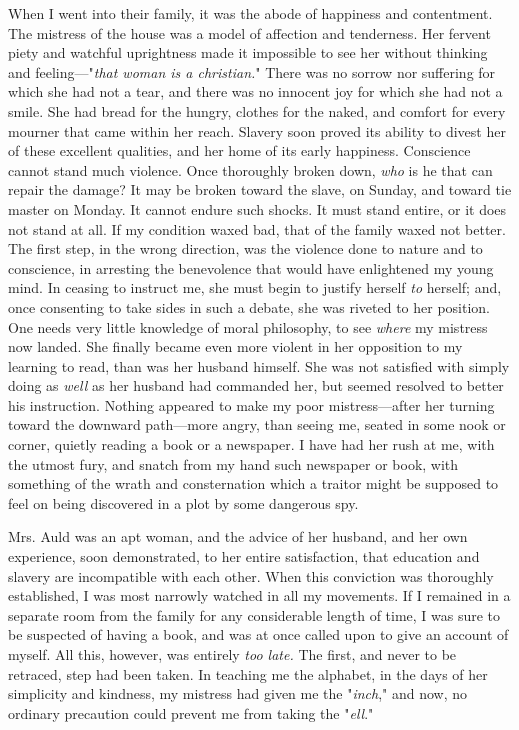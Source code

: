 When I went into their family, it was the abode of happiness and
contentment. The mistress of the house was a model of affection and
tenderness. Her fervent piety and watchful uprightness made it
impossible to see her without thinking and feeling---"\emph{that woman
is a christian.}" There was no sorrow nor suffering for which she had
not a tear, and there was no innocent joy for which she had not a smile.
She had bread for the hungry, clothes for the naked, and comfort for
every mourner that came within her reach. Slavery soon proved its
ability to divest her of these excellent qualities, and her home of its
early happiness. Conscience cannot stand much violence. Once thoroughly
broken down, \emph{who} is he that can repair the damage? It may be
broken toward the slave, on Sunday, and toward tie master on Monday. It
cannot endure such shocks. It must stand entire, or it does not stand at
all. If my condition waxed bad, that of the family waxed not better. The
first step, in the wrong direction, was the violence done to {}nature
and to conscience, in arresting the benevolence that would have
enlightened my young mind. In ceasing to instruct me, she must begin to
justify herself \emph{to} herself; and, once consenting to take sides in
such a debate, she was riveted to her position. One needs very little
knowledge of moral philosophy, to see \emph{where} my mistress now
landed. She finally became even more violent in her opposition to my
learning to read, than was her husband himself. She was not satisfied
with simply doing as \emph{well} as her husband had commanded her, but
seemed resolved to better his instruction. Nothing appeared to make my
poor mistress---after her turning toward the downward path---more angry,
than seeing me, seated in some nook or corner, quietly reading a book or
a newspaper. I have had her rush at me, with the utmost fury, and snatch
from my hand such newspaper or book, with something of the wrath and
consternation which a traitor might be supposed to feel on being
discovered in a plot by some dangerous spy.

Mrs. Auld was an apt woman, and the advice of her husband, and her own
experience, soon demonstrated, to her entire satisfaction, that
education and slavery are incompatible with each other. When this
conviction was thoroughly established, I was most narrowly watched in
all my movements. If I remained in a separate room from the family for
any considerable length of time, I was sure to be suspected of having a
book, and was at once called upon to give an account of myself. All
this, however, was entirely \emph{too late.} The first, and never to be
retraced, step had been taken. In teaching me the alphabet, in the
{}days of her simplicity and kindness, my mistress had given me the
"\emph{inch}," and now, no ordinary precaution could prevent me from
taking the "\emph{ell}."

